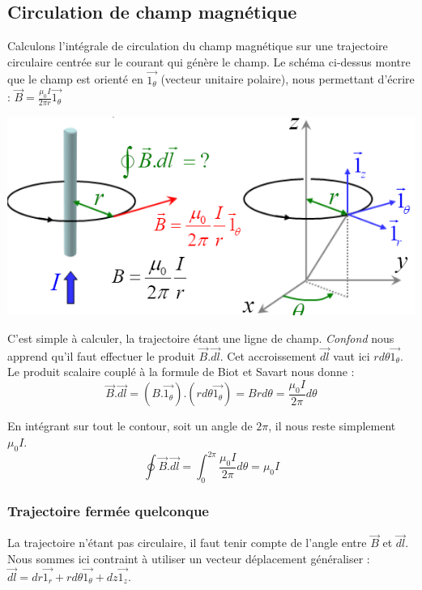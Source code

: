 \documentclass	[11pt, a4paper, openany]{book}
\begin{document}
\subsection{Circulation de champ magnétique}
Calculons l'intégrale de circulation du champ magnétique sur une trajectoire circulaire centrée sur le courant qui génère le champ. Le schéma ci-dessus montre  que le champ est orienté en $\vec{1_\theta}$ (vecteur unitaire polaire), nous permettant d'écrire : $\vec{B} = \frac{\mu_0 I}{2\pi r}\vec{1_\theta}$
\begin{center}
	\includegraphics[scale=0.65]{magneto/image5.png}
\end{center}

C'est simple à calculer, la trajectoire étant une ligne de champ. \textit{Confond} nous apprend qu'il faut effectuer le produit $\vec{B}.\vec{dl}$. Cet accroissement $\vec{dl}$ vaut ici $rd\theta\vec{1_\theta}$. Le produit scalaire couplé à la formule de Biot et Savart nous donne :
\begin{equation}
	\vec{B}.\vec{dl} = (B.\vec{1_\theta}).(rd\theta\vec{1_\theta}) = Brd\theta = \frac{\mu_0 I}{2\pi} d\theta
\end{equation}

En intégrant sur tout le contour, soit un angle de $2\pi$, il nous reste simplement $\mu_0 I$.
\begin{equation}
	\oint \vec{B}.\vec{dl} = \int_0^{2\pi} \frac{\mu_0 I}{2\pi} d\theta = \mu_0 I
\end{equation}


\subsubsection*{Trajectoire fermée quelconque}
La trajectoire n'étant pas circulaire, il faut tenir compte de l'angle entre $\vec{B}$ et $\vec{dl}$. Nous sommes ici contraint à utiliser un vecteur déplacement généraliser : $\vec{dl} = dr \vec{1_r} + rd\theta \vec{1_\theta} + dz \vec{1_z}$. \\
\end{document}
